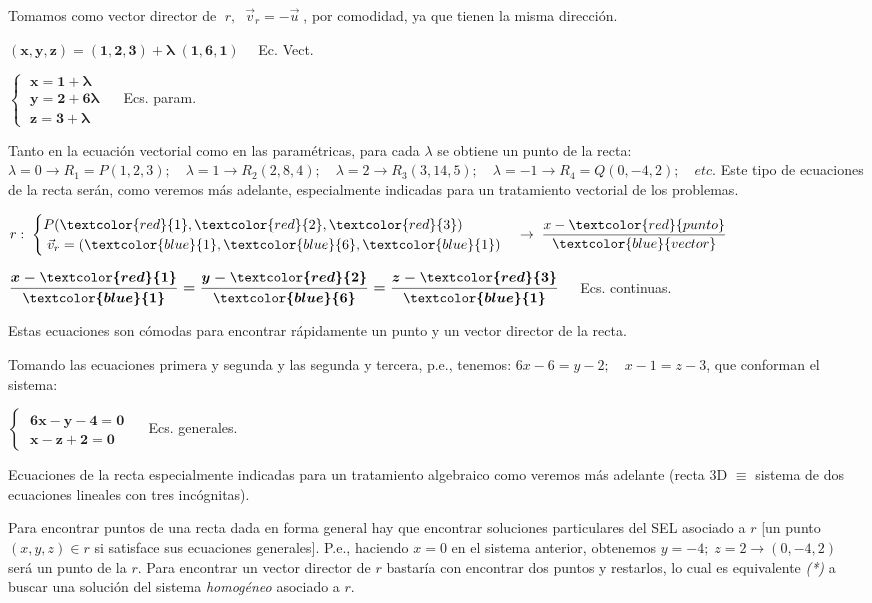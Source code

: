 \noindent \normalsize{Tomamos} como vector director de $\;r,\; \; \vec v_r=-\vec u\;$,  por comodidad, ya que tienen la misma dirección.

 $\boldsymbol{(x,y,z)=(1,2,3)+\lambda \; (1,6,1)}\quad$ Ec. Vect.

 $\boldsymbol{ \begin{cases} \; x=1+\lambda \\ \;y=2+6\lambda \\ \; z=3+\lambda \end{cases} } \quad$ Ecs. param.

\noindent \textcolor{gris}{Tanto en la ecuación vectorial como en las paramétricas, para cada $\lambda$ se obtiene un punto de la recta: $\lambda=0 \to R_1=P(1,2,3); \quad \lambda = 1 \to R_2(2,8,4); \quad \lambda=2 \to R_3(3,14,5); \quad \lambda=-1 \to R_4=Q(0,-4,2);\quad etc.$ Este tipo de ecuaciones de la recta serán, como veremos más adelante, especialmente indicadas para un tratamiento vectorial de los problemas.}

 \noindent $r:\; \begin{cases} P(\textcolor{red}{1},\textcolor{red}{2},\textcolor{red}{3})\\ \; \vec v_r=(\textcolor{blue}{1},\textcolor{blue}{6},\textcolor{blue}{1}) \end{cases} \to  \; \dfrac {x-\textcolor{red}{punto}}{\textcolor{blue}{vector}} \qquad$
 
  $\boldsymbol{ \dfrac {x-\textcolor{red}{1}}{\textcolor{blue}{1}} = \dfrac {y-\textcolor{red}{2}}{\textcolor{blue}{6}} = \dfrac {z-\textcolor{red}{3}}{\textcolor{blue}{1}} } \quad$ Ecs. continuas.

\noindent \textcolor{gris}{Estas ecuaciones son cómodas para encontrar rápidamente un punto y un vector director de la recta.}

\noindent Tomando las ecuaciones primera y segunda y las segunda y tercera, p.e., tenemos: $6x-6=y-2; \quad x-1=z-3$, que conforman el sistema:

$\boldsymbol{ \begin{cases} \; 6x-y-4=0\\ \; x-z+2=0 \end{cases} } \quad$ Ecs. generales.

\noindent \textcolor{gris}{Ecuaciones de la recta especialmente indicadas para un tratamiento algebraico como veremos más adelante (recta 3D $\equiv$ sistema de dos ecuaciones lineales con tres incógnitas).}

\noindent \textcolor{gris}{Para encontrar puntos de una recta dada en forma general hay que encontrar soluciones particulares del SEL asociado a $r$ [un punto $(x,y,z) \in r$ si satisface sus ecuaciones generales]. P.e., haciendo $x=0$ en el sistema anterior, obtenemos $y=-4;\; z=2 \to (0,-4,2)\;$ será un punto de la $r$. Para encontrar un vector director de $r$ bastaría con encontrar dos puntos y restarlos, lo cual es equivalente \textit{(*)} a buscar una solución del sistema \textit{homogéneo} asociado a $r$.  }

